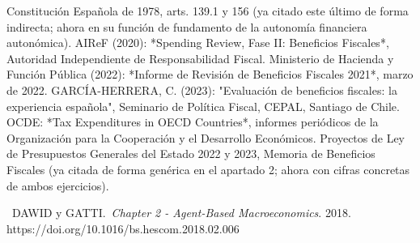 \documentclass[10pt,a4paper]{article}
\newcounter{myref}
\newcommand{\MyBibItem}[4]{%
  \refstepcounter{myref}%
  \noindent[\themyref]\ #1.\ \emph{#2}. #3. #4\par
}
\begin{document}
Constitución Española de 1978, arts. 139.1 y 156 (ya citado este último de forma indirecta; ahora en su función de fundamento de la autonomía financiera autonómica).
AIReF (2020): *Spending Review, Fase II: Beneficios Fiscales*, Autoridad Independiente de Responsabilidad Fiscal.
Ministerio de Hacienda y Función Pública (2022): *Informe de Revisión de Beneficios Fiscales 2021*, marzo de 2022.
GARCÍA-HERRERA, C. (2023): "Evaluación de beneficios fiscales: la experiencia española", Seminario de Política Fiscal, CEPAL, Santiago de Chile.
OCDE: *Tax Expenditures in OECD Countries*, informes periódicos de la Organización para la Cooperación y el Desarrollo Económicos.
Proyectos de Ley de Presupuestos Generales del Estado 2022 y 2023, Memoria de Beneficios Fiscales (ya citada de forma genérica en el apartado 2; ahora con cifras concretas de ambos ejercicios).

\MyBibItem{DAWID y GATTI}{Chapter 2 - Agent-Based Macroeconomics}{2018}{https://doi.org/10.1016/bs.hescom.2018.02.006}


\clearpage
\end{document}
